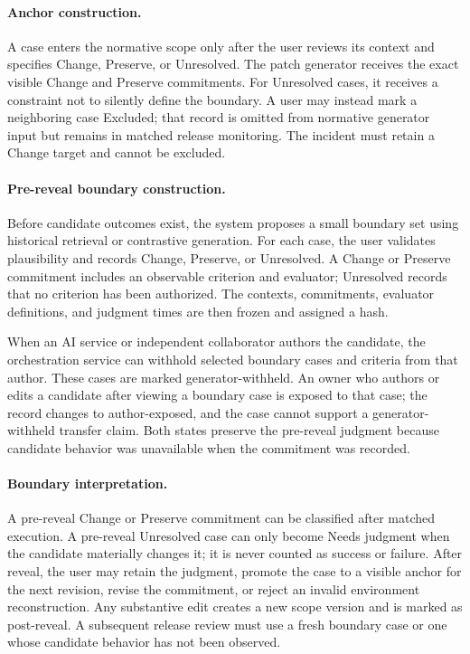 \paragraph{Anchor construction.}
A case enters the normative scope only after the user reviews its context and specifies Change, Preserve, or Unresolved. The patch generator receives the exact visible Change and Preserve commitments. For Unresolved cases, it receives a constraint not to silently define the boundary. A user may instead mark a neighboring case Excluded; that record is omitted from normative generator input but remains in matched release monitoring. The incident must retain a Change target and cannot be excluded.

\paragraph{Pre-reveal boundary construction.}
Before candidate outcomes exist, the system proposes a small boundary set using historical retrieval or contrastive generation. For each case, the user validates plausibility and records Change, Preserve, or Unresolved. A Change or Preserve commitment includes an observable criterion and evaluator; Unresolved records that no criterion has been authorized. The contexts, commitments, evaluator definitions, and judgment times are then frozen and assigned a hash.

When an AI service or independent collaborator authors the candidate, the orchestration service can withhold selected boundary cases and criteria from that author. These cases are marked generator-withheld. An owner who authors or edits a candidate after viewing a boundary case is exposed to that case; the record changes to author-exposed, and the case cannot support a generator-withheld transfer claim. Both states preserve the pre-reveal judgment because candidate behavior was unavailable when the commitment was recorded.

\paragraph{Boundary interpretation.}
A pre-reveal Change or Preserve commitment can be classified after matched execution. A pre-reveal Unresolved case can only become Needs judgment when the candidate materially changes it; it is never counted as success or failure. After reveal, the user may retain the judgment, promote the case to a visible anchor for the next revision, revise the commitment, or reject an invalid environment reconstruction. Any substantive edit creates a new scope version and is marked as post-reveal. A subsequent release review must use a fresh boundary case or one whose candidate behavior has not been observed.

